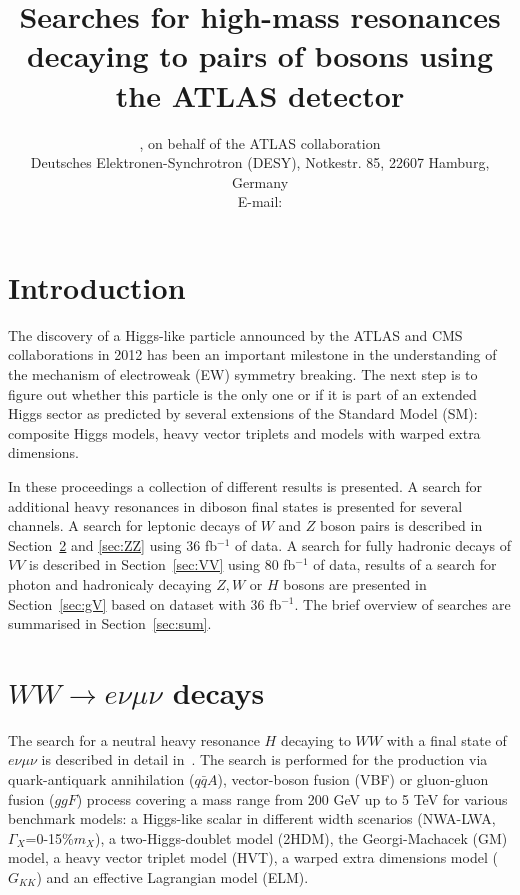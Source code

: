 \documentclass{PoS}
\title{Searches for high-mass resonances decaying to pairs of bosons using the ATLAS detector}
\author{\speaker{Kirill Grevtsov}, {on behalf of the ATLAS collaboration}\\%
        Deutsches Elektronen-Synchrotron (DESY), Notkestr. 85, 22607 Hamburg, Germany\\
        E-mail: \email{kirill.grevtsov@cern.ch}}
\begin{document}
\linenumbers


\section{Introduction}

The discovery of a Higgs-like particle announced by the ATLAS and CMS collaborations in 2012 \cite{HIGG-2012-27,CMS-HIG-12-028} has been an important milestone in the understanding of the mechanism of electroweak (EW) symmetry breaking. %
The next step is to figure out whether this particle is the only one or if it is part of an extended Higgs sector as predicted by several extensions of the Standard Model (SM): composite Higgs models, heavy vector triplets and models with warped extra dimensions.


In these proceedings a collection of different results is presented.
A search for additional heavy resonances in diboson final states is presented for several channels.
A search for leptonic decays of $W$ and $Z$ boson pairs is described in Section~\ref{sec:WW} and \ref{sec:ZZ} using 36 fb$^{-1}$ of data.
A search for fully hadronic decays of $VV$ is described in Section~\ref{sec:VV} using 80 fb$^{-1}$ of data, results of a search for photon and hadronicaly decaying $Z,W$ or $H$ bosons are presented in Section~\ref{sec:gV} based on dataset with 36 fb$^{-1}$. The brief overview of searches are summarised in Section~\ref{sec:sum}.


\section{$WW\rightarrow e\nu \mu \nu$ decays}
\label{sec:WW}
The search for a neutral heavy resonance $H$ decaying to $WW$ with a final state of $e\nu \mu \nu$ is described in detail in~\cite{HIGG-2016-31}. 
The search is performed for the production via quark-antiquark annihilation ($q\bar{q}A$), vector-boson fusion (VBF) or gluon-gluon fusion ($ggF$) process covering a mass range from 200 GeV up to 5 TeV for various benchmark models: a Higgs-like scalar in different width scenarios (NWA-LWA, $\Gamma_X$=0-15\%$m_X$), a two-Higgs-doublet model (2HDM), the Georgi-Machacek (GM) model, a heavy vector triplet model (HVT), a warped extra dimensions model ($G_{KK}$) and an effective Lagrangian model (ELM).
\end{document}
